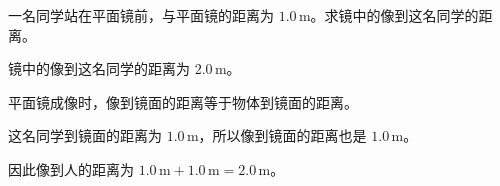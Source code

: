 
\begin{problem}
一名同学站在平面镜前，与平面镜的距离为 $1.0\,\mathrm{m}$。求镜中的像到这名同学的距离。
\end{problem}

\begin{answer}
镜中的像到这名同学的距离为 $2.0\,\mathrm{m}$。
\end{answer}

\begin{solutions}
平面镜成像时，像到镜面的距离等于物体到镜面的距离。

这名同学到镜面的距离为 $1.0\,\mathrm{m}$，所以像到镜面的距离也是 $1.0\,\mathrm{m}$。

因此像到人的距离为 $1.0\,\mathrm{m}+1.0\,\mathrm{m}=2.0\,\mathrm{m}$。
\end{solutions}
